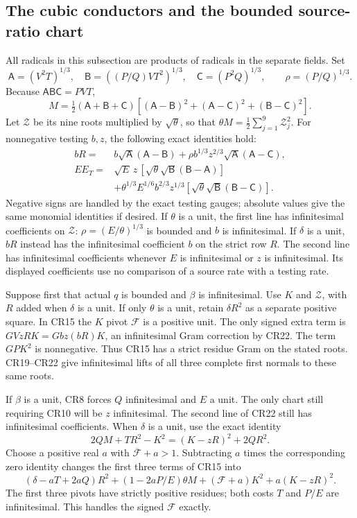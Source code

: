 \subsection{The cubic conductors and the bounded source-ratio chart}

All radicals in this subsection are products of radicals in the
separate fields. Set
\[
 \mathsf A=(V^2T)^{1/3},\quad
 \mathsf B=((P/Q)VT^2)^{1/3},\quad
 \mathsf C=(P^2Q)^{1/3},\qquad \rho=(P/Q)^{1/3}.
\]
Because $\mathsf A\mathsf B\mathsf C=PVT$,
\[
 M=\tfrac12(\mathsf A+\mathsf B+\mathsf C)
 [ (\mathsf A-\mathsf B)^2+(\mathsf A-\mathsf C)^2
                         +(\mathsf B-\mathsf C)^2].
 \tag{CR21}
\]
Let $\mathcal Z$ be its nine roots multiplied by $\sqrt\theta$,
so that $\theta M=\frac12\sum_{j=1}^9\mathcal Z_j^2$.
For nonnegative testing $b,z$, the following exact identities hold:
\[
\begin{aligned}
 bR={}&b\sqrt{\mathsf A}(\mathsf A-\mathsf B)
       +\rho b^{1/3}z^{2/3}\sqrt{\mathsf A}(\mathsf A-\mathsf C),\\
 E E_T={}&\sqrt E\,z\,[\sqrt\theta\sqrt{\mathsf B}
                                      (\mathsf B-\mathsf A)]\\
 &+\theta^{1/3}E^{1/6}b^{2/3}z^{1/3}
       [\sqrt\theta\sqrt{\mathsf B}(\mathsf B-\mathsf C)].
\end{aligned}\tag{CR22}
\]
Negative signs are handled by the exact testing gauges; absolute
values give the same monomial identities if desired. If $\theta$
is a unit, the first line has infinitesimal coefficients on
$\mathcal Z$: $\rho=(E/\theta)^{1/3}$ is bounded and $b$ is
infinitesimal. If $\delta$ is a unit, $bR$ instead has the
infinitesimal coefficient $b$ on the strict row $R$. The second
line has infinitesimal coefficients whenever $E$ is infinitesimal
or $z$ is infinitesimal. Its displayed coefficients use no
comparison of a source rate with a testing rate.

Suppose first that actual $q$ is bounded and $\beta$ is
infinitesimal. Use $K$ and $\mathcal Z$, with $R$ added when
$\delta$ is a unit. If only $\theta$ is a unit, retain
$\delta R^2$ as a separate positive square. In CR15 the $K$
pivot $\mathcal F$ is a positive unit. The only signed extra
term is
$GVzRK=Gbz(bR)K$, an infinitesimal Gram correction by CR22.
The term $GPK^2$ is nonnegative. Thus CR15 has a strict residue
Gram on the stated roots. CR19--CR22 give infinitesimal lifts of
all three complete first normals to these same roots.

If $\beta$ is a unit, CR8 forces $Q$ infinitesimal and $E$ a
unit. The only chart still requiring CR10 will be $z$ infinitesimal.
The second line of CR22 still has infinitesimal coefficients.
When $\delta$ is a unit, use the exact identity
\[
 2QM+TR^2-K^2=(K-zR)^2+2QR^2.
 \tag{CR23}
\]
Choose a positive real $a$ with $\overline{\mathcal F}+a>1$.
Subtracting $a$ times the corresponding zero identity changes the
first three terms of CR15 into
\[
 (\delta-aT+2aQ)R^2+(1-2aP/E)\theta M
       +(\mathcal F+a)K^2+a(K-zR)^2.
 \tag{CR24}
\]
The first three pivots have strictly positive residues; both costs
$T$ and $P/E$ are infinitesimal. This handles the signed
$\mathcal F$ exactly.


